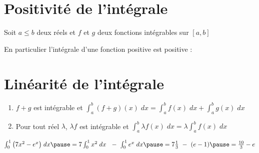 \section*{Positivité de l'intégrale}


\begin{frame}

\begin{proposition}
Soit $a \le b$ deux réels et $f$ et $g$ deux fonctions intégrables sur $[a,b]$
\end{proposition}

\pause
\bigskip
\bigskip

En particulier l'intégrale d'une fonction positive est positive :

\end{frame}


\section*{Linéarité de l'intégrale}


\begin{frame}

\begin{enumerate}
  \item $f+g$ est intégrable et $\int_a^b (f+g)(x) \; dx= \int_a^b f(x) \; dx+ \int_a^b g(x) \; dx$

\pause

  \item Pour tout réel $\lambda$,  $\lambda f$ est
intégrable et $\int_a^b \lambda f(x) \; dx= \lambda \int_a^b f(x) \; dx$
\end{enumerate}

\pause

\begin{proposition}
\end{proposition}

\pause
\bigskip

\begin{exemple}
$\int_0^1 \big(7x^2-e^x\big) \; dx  \pause= 7 \int_0^1 x^2\; dx \ \ - \  \int_0^1 e^x \; dx \pause= 7 \frac 13 \ - \ (e-1) \pause= \frac{10}{3}-e$
\end{exemple}

\end{frame}





